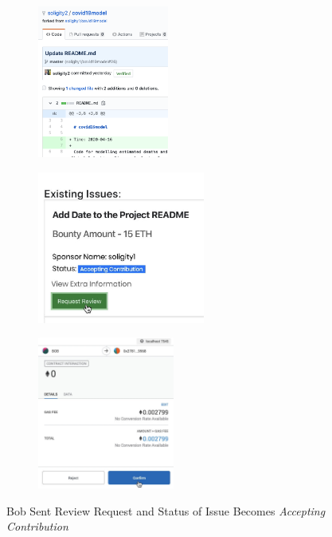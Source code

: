\documentclass[12pt]{article}
\renewcommand{\_}{\kern-1.5pt\textunderscore\kern-1.5pt}
\begin{document}
\begin{figure}[H]
	\centering
	\begin{subfigure}[b]{.32\textwidth}
		\centering
		\includegraphics[height=5cm]{graphs/33. bob_update_readme}
	\end{subfigure}
	\begin{subfigure}[b]{.40\textwidth}
		\centering
		\includegraphics[height=5cm]{graphs/34. bob_review_request}
	\end{subfigure}
	\begin{subfigure}[b]{.25\textwidth}
		\centering
		\includegraphics[height=5cm]{graphs/35. bob_review_request_metamask}
	\end{subfigure}

	\caption{Bob Sent Review Request and Status of Issue Becomes \textit{Accepting Contribution}}
\end{figure}
\end{document}
